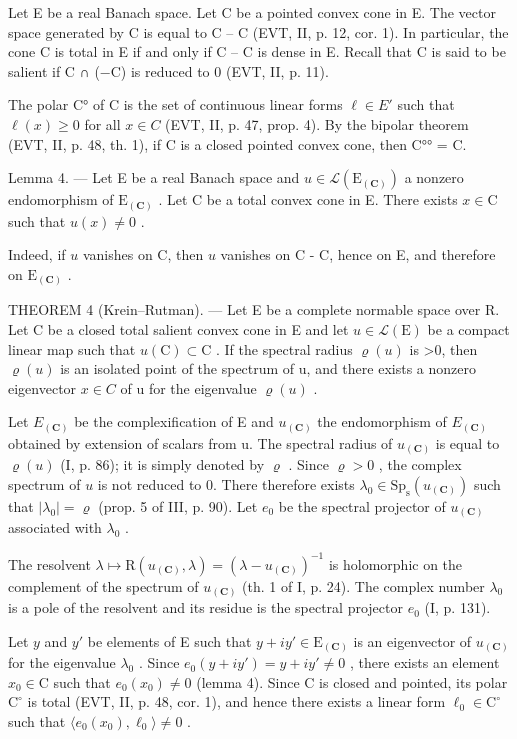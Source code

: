 Let E be a real Banach space. Let C be a pointed convex cone in E. The vector space generated by C is equal to C -- C (EVT, II, p. 12, cor. 1). In particular, the cone C is total in E if and only if C -- C is dense in E. Recall that C is said to be salient if C ∩ (−C) is reduced to 0 (EVT, II, p. 11).

The polar C° of C is the set of continuous linear forms \(\ell \in E'\) such that \(\ell(x) \geqslant 0\) for all \(x \in C\) (EVT, II, p. 47, prop. 4). By the bipolar theorem (EVT, II, p. 48, th. 1), if C is a closed pointed convex cone, then C°° = C.

Lemma 4. --- Let E be a real Banach space and \(u \in \mathcal{L}(\mathrm{E}_{(\mathbf{C})})\) a nonzero endomorphism of \(\mathrm{E}_{(\mathbf{C})}\) . Let C be a total convex cone in E. There exists \(x \in \mathrm{C}\) such that \(u(x) \neq 0\) .

Indeed, if \(u\) vanishes on C, then \(u\) vanishes on C - C, hence on E, and therefore on \(\mathrm{E}_{(\mathbf{C})}\) .

THEOREM 4 (Krein--Rutman). --- Let E be a complete normable space over R. Let C be a closed total salient convex cone in E and let \(u \in \mathcal{L}(\mathrm{E})\) be a compact linear map such that \(u(\mathrm{C}) \subset \mathrm{C}\) . If the spectral radius \(\varrho(u)\) is \textgreater0, then \(\varrho(u)\) is an isolated point of the spectrum of u, and there exists a nonzero eigenvector \(x \in C\) of u for the eigenvalue \(\varrho(u)\) .

Let \(E_{(\mathbf{C})}\) be the complexification of E and \(u_{(\mathbf{C})}\) the endomorphism of \(E_{(\mathbf{C})}\) obtained by extension of scalars from u. The spectral radius of \(u_{(\mathbf{C})}\) is equal to \(\varrho(u)\) (I, p. 86); it is simply denoted by \(\varrho\) . Since \(\varrho > 0\) , the complex spectrum of \(u\) is not reduced to 0. There therefore exists \(\lambda_0 \in \mathrm{Sp}_\mathrm{s}(u_{(\mathbf{C})})\) such that \(|\lambda_0| = \varrho\) (prop. 5 of III, p. 90). Let \(e_0\) be the spectral projector of \(u_{(\mathbf{C})}\) associated with \(\lambda_0\) .

The resolvent \(\lambda \mapsto \mathrm{R}(u_{(\mathbf{C})},\lambda) = (\lambda -u_{(\mathbf{C})})^{-1}\) is holomorphic on the complement of the spectrum of \(u_{(\mathbf{C})}\) (th. 1 of I, p. 24). The complex number \(\lambda_0\) is a pole of the resolvent and its residue is the spectral projector \(e_0\) (I, p. 131).

Let \(y\) and \(y'\) be elements of E such that \(y + iy' \in \mathrm{E}_{(\mathbf{C})}\) is an eigenvector of \(u_{(\mathbf{C})}\) for the eigenvalue \(\lambda_0\) . Since \(e_0(y + iy') = y + iy' \neq 0\) , there exists an element \(x_0 \in \mathrm{C}\) such that \(e_0(x_0) \neq 0\) (lemma 4). Since C is closed and pointed, its polar \(\mathrm{C}^\circ\) is total (EVT, II, p. 48, cor. 1), and hence there exists a linear form \(\ell_0 \in \mathrm{C}^\circ\) such that \(\langle e_0(x_0), \ell_0 \rangle \neq 0\) .

